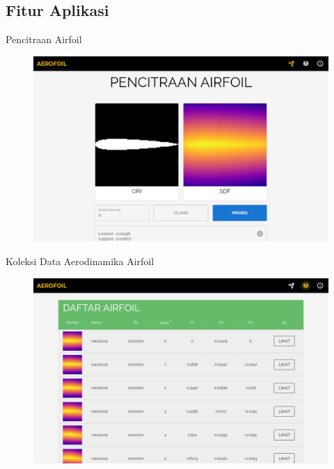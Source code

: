 \subsection{Fitur Aplikasi}
\begin{frame}{Pencitraan Airfoil}
  \begin{figure}[h]
    \centering
    \includegraphics[width=0.7\linewidth]{statics/citra_airfoil}
  \end{figure}
\end{frame}

\begin{frame}{Koleksi Data Aerodinamika Airfoil}
  \begin{figure}[h]
    \centering
    \includegraphics[width=0.7\linewidth]{statics/aerodinamika_airfoil}
  \end{figure}
\end{frame}

